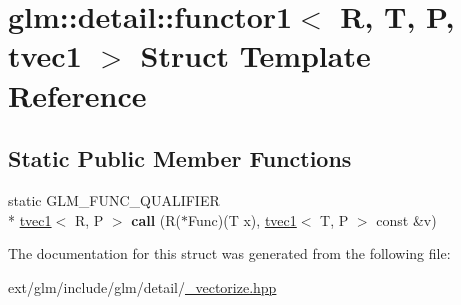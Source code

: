 \hypertarget{structglm_1_1detail_1_1functor1_3_01_r_00_01_t_00_01_p_00_01tvec1_01_4}{\section{glm\-:\-:detail\-:\-:functor1$<$ R, T, P, tvec1 $>$ Struct Template Reference}
\label{structglm_1_1detail_1_1functor1_3_01_r_00_01_t_00_01_p_00_01tvec1_01_4}
}
\subsection*{Static Public Member Functions}
\begin{DoxyCompactItemize}
\item 
\hypertarget{structglm_1_1detail_1_1functor1_3_01_r_00_01_t_00_01_p_00_01tvec1_01_4_af5dd270c9695023917f2c43e61fa10e0}{static G\-L\-M\-\_\-\-F\-U\-N\-C\-\_\-\-Q\-U\-A\-L\-I\-F\-I\-E\-R \\*
\hyperlink{structglm_1_1tvec1}{tvec1}$<$ R, P $>$ {\bfseries call} (R($\ast$Func)(T x), \hyperlink{structglm_1_1tvec1}{tvec1}$<$ T, P $>$ const \&v)}\label{structglm_1_1detail_1_1functor1_3_01_r_00_01_t_00_01_p_00_01tvec1_01_4_af5dd270c9695023917f2c43e61fa10e0}

\end{DoxyCompactItemize}


The documentation for this struct was generated from the following file\-:\begin{DoxyCompactItemize}
\item 
ext/glm/include/glm/detail/\hyperlink{__vectorize_8hpp}{\-\_\-vectorize.\-hpp}\end{DoxyCompactItemize}
